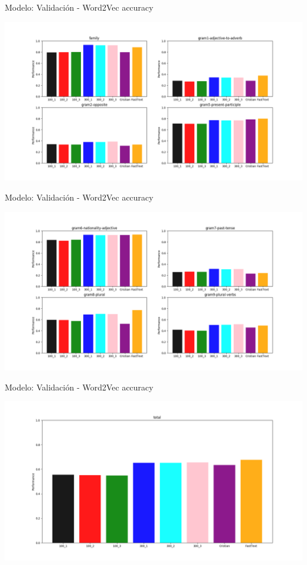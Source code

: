 \documentclass[10pt]{beamer}
\begin{document}
\begin{frame}{Modelo: Validación - Word2Vec accuracy}
  \begin{center}
    \includegraphics[width=1\textwidth]{plot2.png}
  \end{center}
\end{frame}

\begin{frame}{Modelo: Validación - Word2Vec accuracy}
  \begin{center}
    \includegraphics[width=1\textwidth]{plot3.png}
  \end{center}
\end{frame}

\begin{frame}{Modelo: Validación - Word2Vec accuracy}
  \begin{center}
    \includegraphics[width=1\textwidth]{total.png}
  \end{center}
\end{frame}
\end{document}
